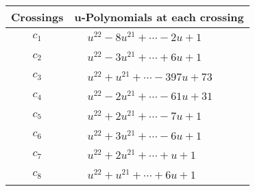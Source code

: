 \documentclass[1p]{elsarticle_modified}
\theoremstyle{definition}
\begin{document}
\begin{tabular}{m{50pt}|m{274pt}}
Crossings & \hspace{64pt}u-Polynomials at each crossing \\
\hline $$\begin{aligned}c_{1}\end{aligned}$$&$\begin{aligned}
&u^{22}-8 u^{21}+\cdots-2 u+1
\end{aligned}$\\
\hline $$\begin{aligned}c_{2}\end{aligned}$$&$\begin{aligned}
&u^{22}-3 u^{21}+\cdots+6 u+1
\end{aligned}$\\
\hline $$\begin{aligned}c_{3}\end{aligned}$$&$\begin{aligned}
&u^{22}+u^{21}+\cdots-397 u+73
\end{aligned}$\\
\hline $$\begin{aligned}c_{4}\end{aligned}$$&$\begin{aligned}
&u^{22}-2 u^{21}+\cdots-61 u+31
\end{aligned}$\\
\hline $$\begin{aligned}c_{5}\end{aligned}$$&$\begin{aligned}
&u^{22}+2 u^{21}+\cdots-7 u+1
\end{aligned}$\\
\hline $$\begin{aligned}c_{6}\end{aligned}$$&$\begin{aligned}
&u^{22}+3 u^{21}+\cdots-6 u+1
\end{aligned}$\\
\hline $$\begin{aligned}c_{7}\end{aligned}$$&$\begin{aligned}
&u^{22}+2 u^{21}+\cdots+u+1
\end{aligned}$\\
\hline $$\begin{aligned}c_{8}\end{aligned}$$&$\begin{aligned}
&u^{22}+u^{21}+\cdots+6 u+1
\end{aligned}$\\

\end{tabular}
\end{document}
